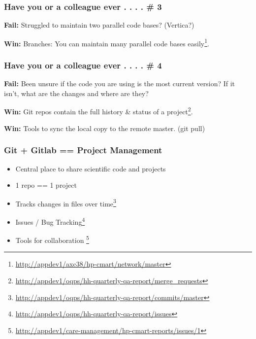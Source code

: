 \documentclass{beamer}
\begin{document}
\begin{frame} %
  \frametitle{Have you or a colleague ever . . . . \# 3}

  \textbf{Fail:} Struggled to maintain two parallel code bases? (Vertica?)

  \medskip 
  \noindent\makebox[\linewidth]{\rule{\textwidth}{0.4pt}}
  \medskip

  \textbf{Win:} Branches: You can maintain many parallel code
  bases easily\footnote{\url{http://appdev1/axc38/hp-cmart/network/master}}.

\end{frame}
 
\begin{frame} %
  \frametitle{Have you or a colleague ever . . . . \# 4} 

  \textbf{Fail:} Been unsure if the code you are using is the most
  current version? If it isn't, what are the changes and where are they?
  
  \medskip 
  \noindent\makebox[\linewidth]{\rule{\textwidth}{0.4pt}}
  \medskip

  \textbf{Win:} Git repos  contain the full history \& status of a project\footnote{\url{http://appdev1/oqps/hh-quarterly-qa-report/merge_requests}}.

  \medskip
  \textbf{Win:} Tools to sync the local copy to the remote
  master. (git pull)

\end{frame}

\begin{frame} %
  \frametitle{Git + Gitlab == Project Management}
  \begin{itemize}
  \item Central place to share scientific code and projects
  \item  1 repo == 1 project
  \item Tracks changes in files over time\footnote{\url{http://appdev1/oqps/hh-quarterly-qa-report/commits/master}}
  \item Issues / Bug Tracking\footnote{\url{http://appdev1/oqps/hh-quarterly-qa-report/issues}}
  \item Tools for
    collaboration
    \footnote{\url{http://appdev1/care-management/hp-cmart-reports/issues/1}}
  \end{itemize}
\end{frame}
\end{document}
